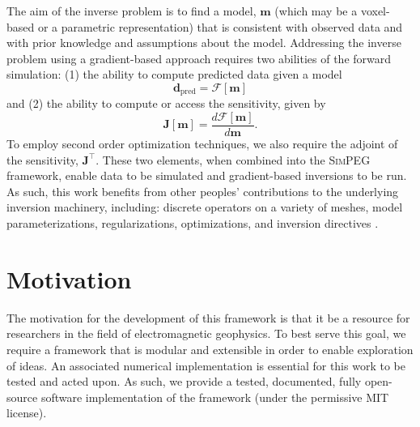 \documentclass[preprint,review,3p,times,onecolumn,authoryear]{elsarticle}
\newcommand{\SimPEG}{\textsc{SimPEG}\xspace}
\newcommand{\dpred}{\mathbf{d}_\text{pred}}
\begin{document}
The aim of the inverse problem is to find a model, $\mathbf{m}$ (which may be a voxel-based or a parametric representation) that is consistent with observed data and with prior knowledge and assumptions about the model. Addressing the inverse problem using a gradient-based approach requires two abilities of the forward simulation: (1) the ability to compute predicted data given a model
\begin{equation}
\dpred = \mathcal{F}[\mathbf{m}]
\label{eq:dpred}
\end{equation}
and (2) the ability to compute or access the sensitivity, given by
\begin{equation}
    \mathbf{J}[\mathbf{m}] = \frac{d \mathcal{F}[\mathbf{m}]}{ d \mathbf{m}}.
    \label{eq:sensitivity}
\end{equation}
To employ second order optimization techniques, we also require  the adjoint of the sensitivity, $\mathbf{J}^\top$. These two elements, when combined into the \SimPEG framework, enable data to be simulated and gradient-based inversions to be run. As such, this work benefits from other peoples' contributions to the underlying inversion machinery, including: discrete operators on a variety of meshes, model parameterizations, regularizations, optimizations, and inversion directives \citep{Cockett2015}.


\section{Motivation}
\label{sec:Motivation}

The motivation for the development of this framework is that it be a resource
for researchers in the field of electromagnetic geophysics. To best serve this
goal, we require a framework that is modular and extensible in order to enable
exploration of ideas. An associated numerical implementation is essential for
this work to be tested and acted upon. As such, we provide a tested,
documented, fully open-source software implementation of the framework (under the permissive MIT license).
\end{document}
